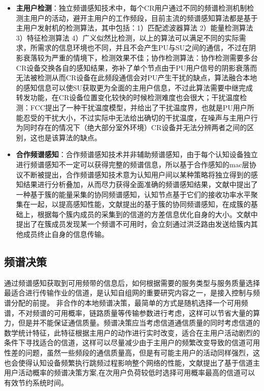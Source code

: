 \documentclass[a4paper,AutoFakeBold,oneside,12pt]{book}
\begin{document}
  \begin{itemize}
\item  \textbf{主用户检测}：独立频谱感知技术中，每个CR用户通过不同的频谱检测机制检测主用户的活动，避开主用户的工作频段，目前主流的频谱感知算法都是基于主用户发射机的检测算法，其中包括：1）匹配滤波器算法 2）能量检测算法\cite{uapp} 3）特征检测算法\cite{pinpu} 4）广义似然比检测，以上的算法可以满足不同的实际需求，所需求的信息环境也不同，并且不会产生PU与SU之间的通信，不过在阴影衰落较为严重的情境下，检测效果不佳；协作检测算法：协作检测需要多台CR设备交换各自的感知结果，弥补了单个节点由于PU用户信号的阴影衰落而无法被检测从而CR设备在此频段通信会对PU产生干扰的缺点，算法融合本地的感知信息可以使SU获取更为全面的主用户信息，不过此算法需要中继完成转发功能，在CR设备位置变化较快的时候检测难度也会很大；干扰温度检测：FCC提出了一种干扰温度模型，并给出了干扰温度界，也就是PU用户所能忍受的干扰大小，不过实际中无法给出确切的干扰温度，在噪声与主用户行为同时存在的情况下（绝大部分室外环境）CR设备并无法分辨两者之间的区别，这也是该算法的缺点。
\item \textbf{合作频谱感知}：合作频谱感知技术并非辅助频谱感知，由于每个认知设备独立进行频谱感知不一定可以获得完整的频谱信息，所以基于合作感知的mac层协议不断被提出，合作频谱感知技术意为认知用户间以某种策略将独立得到的感知结果进行分析叠加，从而尽力获得全面准确的频谱感知结果，文献\cite{uaQQ}中提出了一种基于簇的能量采集的协同频谱感知，认知节点基于它们的接收功率水平聚集在一起，以提高感知性能，文献\cite{Peipei}提出的基于簇的协同频谱感知，在成簇的基础上，根据每个簇内成员的采集到的信道的方差信息优化自身的大小。文献\cite{hezuo}中提出了在簇成员发现某一个频谱不可用时，会立刻通过洪泛路由发送给簇内其他成员终止自身的信息传输。
\end{itemize}
\subsection{频谱决策}
  通过频谱感知获取到可用频带的信息后，如何根据需要的服务类型与服务质量选择最适合进行传输作业的信道，是认知自组网的重要研究内容之一，是接入控制与频谱分配的前提。
  非合作的本地频谱决策，最简单的方式是随机选择一个可用频谱，不对频谱的可用概率，链路质量等传输参数进行考虑，这样可以节省大量的算力，但是并不能保证通信质量。频谱决策应当考虑信道通信质量的同时考虑信道的数学统计特征，此特征根据主用户的动作进行实时改变，适合在主用户活动剧烈的条件下寻找适合的信道，这样可以尽量减少由于主用户的频繁改变导致的信道可用性差的问题，虽然一些频段的通信质量高，但是有可能主用户的活动同样强烈，这也会使得认知设备频繁执行跳频过程影响整个网络的性能，文献\cite{spectrumdecision}提出了基于信道主用户活动概率的频谱决策方案,在次用户负荷较低时选择可用概率最高的信道可以有效节约系统时间。
\end{document}
